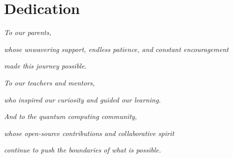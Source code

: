 
\chapter*{Dedication}

\vspace{3cm}

\begin{center}
\textit{To our parents,}

\vspace{0.5cm}

\textit{whose unwavering support, endless patience, and constant encouragement}

\textit{made this journey possible.}

\vspace{1cm}

\textit{To our teachers and mentors,}

\textit{who inspired our curiosity and guided our learning.}

\vspace{1cm}

\textit{And to the quantum computing community,}

\textit{whose open-source contributions and collaborative spirit}

\textit{continue to push the boundaries of what is possible.}
\end{center}

\vspace{3cm}
